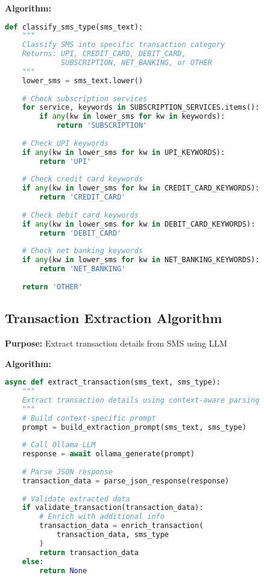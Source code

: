 \documentclass[11pt,a4paper]{report}
\begin{document}
\textbf{Algorithm:}
\begin{lstlisting}[language=Python]
def classify_sms_type(sms_text):
    """
    Classify SMS into specific transaction category
    Returns: UPI, CREDIT_CARD, DEBIT_CARD, 
             SUBSCRIPTION, NET_BANKING, or OTHER
    """
    lower_sms = sms_text.lower()
    
    # Check subscription services
    for service, keywords in SUBSCRIPTION_SERVICES.items():
        if any(kw in lower_sms for kw in keywords):
            return 'SUBSCRIPTION'
    
    # Check UPI keywords
    if any(kw in lower_sms for kw in UPI_KEYWORDS):
        return 'UPI'
    
    # Check credit card keywords
    if any(kw in lower_sms for kw in CREDIT_CARD_KEYWORDS):
        return 'CREDIT_CARD'
    
    # Check debit card keywords
    if any(kw in lower_sms for kw in DEBIT_CARD_KEYWORDS):
        return 'DEBIT_CARD'
    
    # Check net banking keywords
    if any(kw in lower_sms for kw in NET_BANKING_KEYWORDS):
        return 'NET_BANKING'
    
    return 'OTHER'
\end{lstlisting}

\subsection{Transaction Extraction Algorithm}

\textbf{Purpose:} Extract transaction details from SMS using LLM

\textbf{Algorithm:}
\begin{lstlisting}[language=Python]
async def extract_transaction(sms_text, sms_type):
    """
    Extract transaction details using context-aware parsing
    """
    # Build context-specific prompt
    prompt = build_extraction_prompt(sms_text, sms_type)
    
    # Call Ollama LLM
    response = await ollama_generate(prompt)
    
    # Parse JSON response
    transaction_data = parse_json_response(response)
    
    # Validate extracted data
    if validate_transaction(transaction_data):
        # Enrich with additional info
        transaction_data = enrich_transaction(
            transaction_data, sms_type
        )
        return transaction_data
    else:
        return None
\end{lstlisting}
\end{document}
